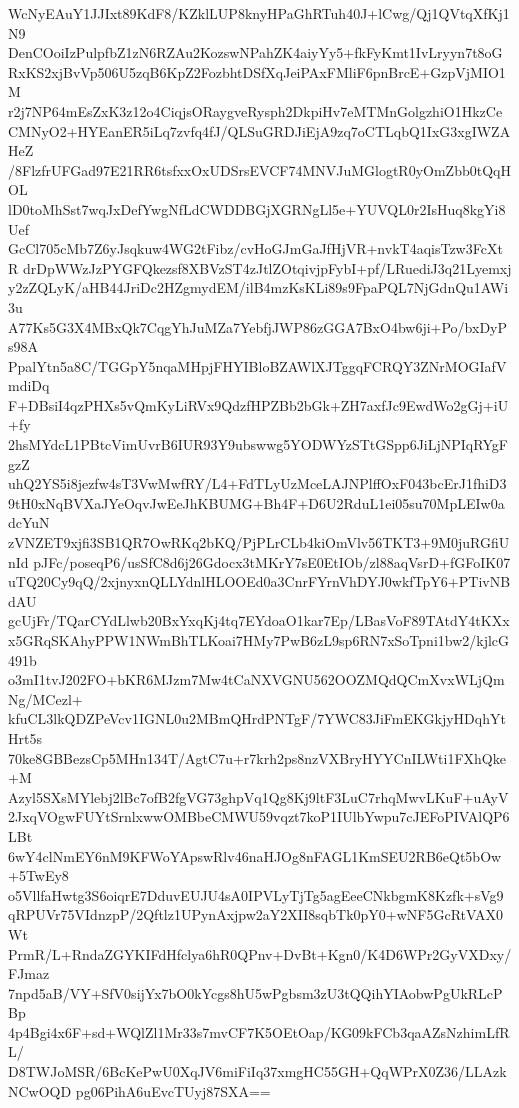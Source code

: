 WcNyEAuY1JJIxt89KdF8/KZklLUP8knyHPaGhRTuh40J+lCwg/Qj1QVtqXfKj1N9
DenCOoiIzPulpfbZ1zN6RZAu2KozswNPahZK4aiyYy5+fkFyKmt1IvLryyn7t8oG
RxKS2xjBvVp506U5zqB6KpZ2FozbhtDSfXqJeiPAxFMliF6pnBrcE+GzpVjMIO1M
r2j7NP64mEsZxK3z12o4CiqjsORaygveRysph2DkpiHv7eMTMnGolgzhiO1HkzCe
CMNyO2+HYEanER5iLq7zvfq4fJ/QLSuGRDJiEjA9zq7oCTLqbQ1IxG3xgIWZAHeZ
/8FlzfrUFGad97E21RR6tsfxxOxUDSrsEVCF74MNVJuMGlogtR0yOmZbb0tQqHOL
lD0toMhSst7wqJxDefYwgNfLdCWDDBGjXGRNgLl5e+YUVQL0r2IsHuq8kgYi8Uef
GcCl705cMb7Z6yJsqkuw4WG2tFibz/cvHoGJmGaJfHjVR+nvkT4aqisTzw3FcXtR
drDpWWzJzPYGFQkezsf8XBVzST4zJtlZOtqivjpFybI+pf/LRuediJ3q21Lyemxj
y2zZQLyK/aHB44JriDc2HZgmydEM/ilB4mzKsKLi89s9FpaPQL7NjGdnQu1AWi3u
A77Ks5G3X4MBxQk7CqgYhJuMZa7YebfjJWP86zGGA7BxO4bw6ji+Po/bxDyPs98A
PpalYtn5a8C/TGGpY5nqaMHpjFHYIBloBZAWlXJTggqFCRQY3ZNrMOGIafVmdiDq
F+DBsiI4qzPHXs5vQmKyLiRVx9QdzfHPZBb2bGk+ZH7axfJc9EwdWo2gGj+iU+fy
2hsMYdcL1PBtcVimUvrB6IUR93Y9ubswwg5YODWYzSTtGSpp6JiLjNPIqRYgFgzZ
uhQ2YS5i8jezfw4sT3VwMwfRY/L4+FdTLyUzMceLAJNPlffOxF043bcErJ1fhiD3
9tH0xNqBVXaJYeOqvJwEeJhKBUMG+Bh4F+D6U2RduL1ei05su70MpLEIw0adcYuN
zVNZET9xjfi3SB1QR7OwRKq2bKQ/PjPLrCLb4kiOmVlv56TKT3+9M0juRGfiUnId
pJFc/poseqP6/usSfC8d6j26Gdocx3tMKrY7sE0EtIOb/zl88aqVsrD+fGFoIK07
uTQ20Cy9qQ/2xjnyxnQLLYdnlHLOOEd0a3CnrFYrnVhDYJ0wkfTpY6+PTivNBdAU
gcUjFr/TQarCYdLlwb20BxYxqKj4tq7EYdoaO1kar7Ep/LBasVoF89TAtdY4tKXx
x5GRqSKAhyPPW1NWmBhTLKoai7HMy7PwB6zL9sp6RN7xSoTpni1bw2/kjlcG491b
o3mI1tvJ202FO+bKR6MJzm7Mw4tCaNXVGNU562OOZMQdQCmXvxWLjQmNg/MCezl+
kfuCL3lkQDZPeVcv1IGNL0u2MBmQHrdPNTgF/7YWC83JiFmEKGkjyHDqhYtHrt5s
70ke8GBBezsCp5MHn134T/AgtC7u+r7krh2ps8nzVXBryHYYCnILWti1FXhQke+M
Azyl5SXsMYlebj2lBc7ofB2fgVG73ghpVq1Qg8Kj9ltF3LuC7rhqMwvLKuF+uAyV
2JxqVOgwFUYtSrnlxwwOMBbeCMWU59vqzt7koP1IUlbYwpu7cJEFoPIVAlQP6LBt
6wY4clNmEY6nM9KFWoYApswRlv46naHJOg8nFAGL1KmSEU2RB6eQt5bOw+5TwEy8
o5VllfaHwtg3S6oiqrE7DduvEUJU4sA0IPVLyTjTg5agEeeCNkbgmK8Kzfk+sVg9
qRPUVr75VIdnzpP/2Qftlz1UPynAxjpw2aY2XII8sqbTk0pY0+wNF5GcRtVAX0Wt
PrmR/L+RndaZGYKIFdHfclya6hR0QPnv+DvBt+Kgn0/K4D6WPr2GyVXDxy/FJmaz
7npd5aB/VY+SfV0sijYx7bO0kYcgs8hU5wPgbsm3zU3tQQihYIAobwPgUkRLcPBp
4p4Bgi4x6F+sd+WQlZl1Mr33s7mvCF7K5OEtOap/KG09kFCb3qaAZsNzhimLfRL/
D8TWJoMSR/6BcKePwU0XqJV6miFiIq37xmgHC55GH+QqWPrX0Z36/LLAzkNCwOQD
pg06PihA6uEvcTUyj87SXA==
